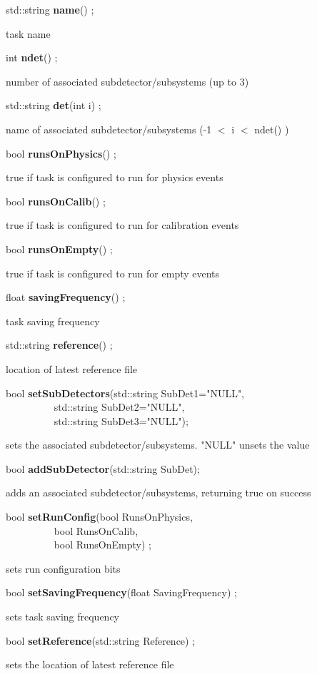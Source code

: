 \item    std::string {\bf name}() ;

 task name


\item    int {\bf ndet}() ;

 number of associated subdetector/subsystems (up to 3)


\item    std::string {\bf det}(int i) ;

 name of associated subdetector/subsystems (-1 $<$ i $<$ ndet() )


\item    bool {\bf runsOnPhysics}() ;

 true if task is configured to run for physics events


\item    bool {\bf runsOnCalib}() ;

 true if task is configured to run for calibration events


\item    bool {\bf runsOnEmpty}() ;

 true if task is configured to run for empty events


\item    float {\bf savingFrequency}() ;

 task saving frequency


\item    std::string {\bf reference}() ;

 location of latest reference file


\item    bool {\bf setSubDetectors}(std::string SubDet1="NULL",\\\mbox{}~~~~~~~~~ 
			std::string SubDet2="NULL",\\\mbox{}~~~~~~~~~ 
			std::string SubDet3="NULL");

 sets the associated subdetector/subsystems. "NULL" unsets the value 


\item    bool {\bf addSubDetector}(std::string SubDet);


 adds an associated subdetector/subsystems, returning true on success


\item    bool {\bf setRunConfig}(bool RunsOnPhysics,\\\mbox{}~~~~~~~~~ 
		    bool RunsOnCalib,\\\mbox{}~~~~~~~~~ 
		    bool RunsOnEmpty) ;

 sets run configuration bits


\item    bool {\bf setSavingFrequency}(float SavingFrequency) ;

 sets task saving frequency


\item    bool {\bf setReference}(std::string Reference) ;

 sets the location of latest reference file


